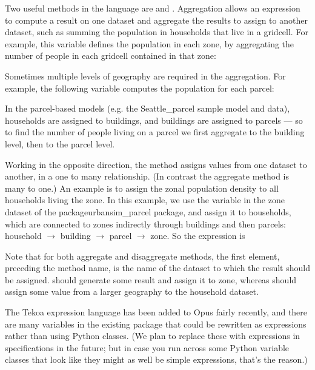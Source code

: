 Two useful methods in the language are  and
.  Aggregation allows an expression to compute a result
on one dataset and aggregate the results to assign to another dataset, such
as summing the population in households that live in a gridcell.  For
example, this variable defines the population in each zone, by aggregating
the number of people in each gridcell contained in that zone:


Sometimes multiple levels of geography are required in the aggregation.
For example, the following variable computes the population for each
parcel:


In the parcel-based models (e.g. the Seattle\_parcel sample model and
data), households are assigned to buildings, and buildings are assigned to
parcels --- so to find the number of people living on a parcel we first
aggregate to the building level, then to the parcel level.

Working in the opposite direction, the  method assigns
values from one dataset to another, in a one to many relationship.  (In
contrast the aggregate method is many to one.)  An example is to assign the
zonal population density to all households living the zone.  In this
example, we use the  variable in the zone dataset
of the package{urbansim\_parcel} package, and assign it to households,
which are connected to zones indirectly through buildings and then parcels:
household $\rightarrow$ building $\rightarrow$ parcel $\rightarrow$ zone.
So the expression is


Note that for both aggregate and disaggregate methods, the first element,
preceding the method name, is the name of the dataset to which the result
should be assigned.   should generate some result
and assign it to zone, whereas  should
assign some value from a larger geography to the household dataset.

The Tekoa expression language has been added to Opus fairly recently, and
there are many variables in the existing  package that
could be rewritten as expressions rather than using Python classes.  (We
plan to replace these with expressions in specifications in the future; but
in case you run across some Python variable classes that look like they
might as well be simple expressions, that's the reason.)

